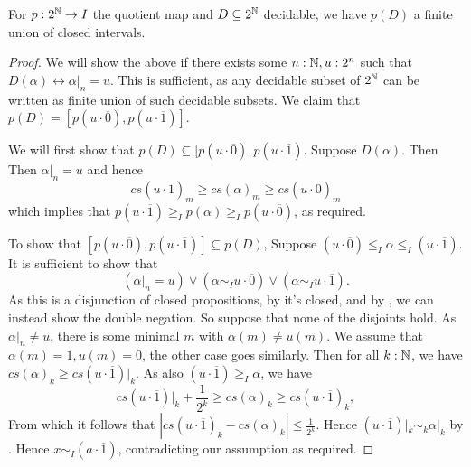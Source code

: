\begin{lemma}\label{ImageDecidableClosedInterval}
  For $p:2^{\mathbb{N}} \to I$ the quotient map and $D\subseteq 2^{\mathbb{N}}$ decidable, we have $p(D)$ a finite union of closed intervals. 
\end{lemma}
\begin{proof}
  We will show the above if there exists some $n:\mathbb{N}, u:2^n$ such that $D(\alpha) \leftrightarrow \alpha|_n = u$.
  This is sufficient, as any decidable subset of $2^{\mathbb{N}}$ can be written as finite union of such decidable subsets. 
  We claim that $p(D) = [p(u\cdot \overline 0) , p(u \cdot \overline 1)]$. 
\item 
  We will first show that $p(D) \subseteq [p(u\cdot \overline 0) , p(u \cdot \overline 1)$. 
  Suppose $D(\alpha)$. Then 
  Then $\alpha|_n = u$ and hence 
  \begin{equation}
    cs(u\cdot \overline 1)_m \geq 
    cs(\alpha)_m \geq 
    cs(u\cdot\overline 0)_m
  \end{equation}
 which implies that $p(u\cdot \overline 1) \geq_I p(\alpha) \geq_I p(u\cdot\overline 0)$, as required. 
\item 
  To show that $[p(u\cdot \overline 0) , p(u \cdot \overline 1)]\subseteq p(D)$, 
  Suppose
  $(u\cdot \overline 0) \leq_I \alpha \leq_I (u \cdot \overline 1)$. 
  It is sufficient to show that 
  $$(\alpha|_n = u )\vee (\alpha \sim_I u \cdot \overline 0 )\vee (\alpha \sim_I u \cdot \overline 1).$$
  As this is a disjunction of closed propositions, by  it's closed, and by 
  , we can instead show the double negation. 
  So suppose that none of the disjoints hold. 
  As $\alpha|_n \neq u$, there is some minimal $m$ with $\alpha(m) \neq u(m)$. 
  We assume that $\alpha(m) = 1, u(m) = 0$, the other case goes similarly. 
  Then for all $k:\mathbb{N}$, we have 
  $cs(\alpha)_k \geq cs(u \cdot \overline 1)|_k$. 
  As also 
  $(u\cdot \overline 1)\geq_I \alpha$, we have 
  $$cs(u \cdot \overline 1)|_k + \frac{1}{2^k} \geq cs(\alpha)_k \geq cs(u\cdot \overline 1)_k,$$
  From which it follows that $|cs(u\cdot\overline 1)_k - cs(\alpha)_k|\leq \frac{1}{2^k}$. 
  Hence $(u\cdot \overline 1)|_k \sim_k \alpha|_k$ by . 
  Hence $x\sim_I (a\cdot\overline 1)$, contradicting our assumption as required. 
\end{proof}

